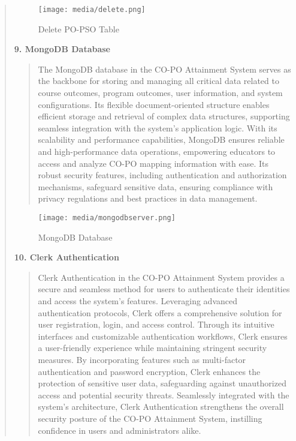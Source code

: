 \documentclass[12pt]{report}
\begin{document}
\begin{quote}
\begin{quote}
		\end{quote}
		
		\begin{figure}[h]
			\centering
			\texttt{[image: media/delete.png]}\\
			\caption{Delete PO-PSO Table}
			\vspace{0.5cm}
		\end{figure}
		\clearpage
		
		\textbf{9. MongoDB Database}\\
		\begin{quote}
			The MongoDB database in the CO-PO Attainment System serves as the backbone for storing and managing all critical data related to course outcomes, program outcomes, user information, and system configurations. Its flexible document-oriented structure enables efficient storage and retrieval of complex data structures, supporting seamless integration with the system's application logic. With its scalability and performance capabilities, MongoDB ensures reliable and high-performance data operations, empowering educators to access and analyze CO-PO mapping information with ease. Its robust security features, including authentication and authorization mechanisms, safeguard sensitive data, ensuring compliance with privacy regulations and best practices in data management.
			\\[3ex]
		\end{quote}
		
		\begin{figure}[h]
			\centering
			\texttt{[image: media/mongodbserver.png]}\\
			\caption{MongoDB Database}
			\vspace{0.5cm}
		\end{figure}
		\clearpage
		
		\textbf{10. Clerk Authentication}\\
		\begin{quote}
			Clerk Authentication in the CO-PO Attainment System provides a secure and seamless method for users to authenticate their identities and access the system's features. Leveraging advanced authentication protocols, Clerk offers a comprehensive solution for user registration, login, and access control. Through its intuitive interfaces and customizable authentication workflows, Clerk ensures a user-friendly experience while maintaining stringent security measures. By incorporating features such as multi-factor authentication and password encryption, Clerk enhances the protection of sensitive user data, safeguarding against unauthorized access and potential security threats. Seamlessly integrated with the system's architecture, Clerk Authentication strengthens the overall security posture of the CO-PO Attainment System, instilling confidence in users and administrators alike.
			\\[3ex]
		\end{quote}
		

\end{quote}
\end{document}
